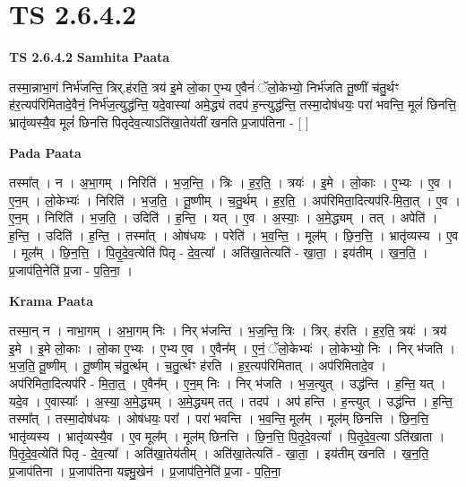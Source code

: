 \documentclass[17pt]{extarticle}
\begin{document}
\section{ TS 2.6.4.2 }

\textbf{TS 2.6.4.2 } \newline
\textbf{Samhita Paata} \newline

तस्मा॒न्नाभा॒गं निर्भ॑जन्ति॒ त्रिर्.ह॑रति॒ त्रय॑ इ॒मे लो॒का ए॒भ्य ए॒वैनं॑ ॅलो॒केभ्यो॒ निर्भ॑जति तू॒ष्णीं च॑तु॒र्थꣳ ह॑र॒त्यप॑रिमितादे॒वैनं॒ निर्भ॑ज॒त्युद्ध॑न्ति॒ यदे॒वास्या॑ अमे॒द्ध्यं तदप॑ ह॒न्त्युद्ध॑न्ति॒ तस्मा॒दोष॑धयः॒ परा॑ भवन्ति॒ मूलं॑ छिनत्ति॒ भ्रातृ॑व्यस्यै॒व मूलं॑ छिनत्ति पितृदेव॒त्याऽति॑खा॒तेय॑तीं खनति प्र॒जाप॑तिना - [  ] \newline

\textbf{Pada Paata} \newline

तस्मा᳚त् । न । अ॒भा॒गम् । निरिति॑ । भ॒ज॒न्ति॒ । त्रिः । ह॒र॒ति॒ । त्रयः॑ । इ॒मे । लो॒काः । ए॒भ्यः । ए॒व । ए॒न॒म् । लो॒केभ्यः॑ । निरिति॑ । भ॒ज॒ति॒ । तू॒ष्णीम् । च॒तु॒र्थम् । ह॒र॒ति॒ । अप॑रिमिता॒दित्यप॑रि-मि॒ता॒त् । ए॒व । ए॒न॒म् । निरिति॑ । भ॒ज॒ति॒ । उदिति॑ । ह॒न्ति॒ । यत् । ए॒व । अ॒स्याः॒ । अ॒मे॒द्ध्यम् । तत् । अपेति॑ । ह॒न्ति॒ । उदिति॑ । ह॒न्ति॒ । तस्मा᳚त् । ओष॑धयः । परेति॑ । भ॒व॒न्ति॒ । मूल᳚म् । छि॒न॒त्ति॒ । भ्रातृ॑व्यस्य । ए॒व । मूल᳚म् । छि॒न॒त्ति॒ । पि॒तृ॒दे॒व॒त्येति॑ पितृ - दे॒व॒त्या᳚ । अति॑खा॒तेत्यति॑ - खा॒ता॒ । इय॑तीम् । ख॒न॒ति॒ । प्र॒जाप॑ति॒नेति॑ प्र॒जा - प॒ति॒ना॒ ।  \newline


\textbf{Krama Paata} \newline

तस्मा॒न् न । नाभा॒गम् । अ॒भा॒गम् निः । निर् भ॑जन्ति । भ॒ज॒न्ति॒ त्रिः । त्रिर्. ह॑रति । ह॒र॒ति॒ त्रयः॑ । त्रय॑ इ॒मे । इ॒मे लो॒काः । लो॒का ए॒भ्यः । ए॒भ्य ए॒व । ए॒वैन᳚म् । ए॒नं॒ ॅलो॒केभ्यः॑ । लो॒केभ्यो॒ निः । निर् भ॑जति । भ॒ज॒ति॒ तू॒ष्णीम् । तू॒ष्णीम् च॑तु॒र्त्थम् । च॒तु॒र्त्थꣳ ह॑रति । ह॒र॒त्यप॑रिमितात् । अप॑रिमितादे॒व । अप॑रिमिता॒दित्यप॑रि - मि॒ता॒त्॒ । ए॒वैन᳚म् । ए॒न॒म् निः । निर् भ॑जति । भ॒ज॒त्युत् । उद्ध॑न्ति । ह॒न्ति॒ यत् । यदे॒व । ए॒वास्याः᳚ । अ॒स्या॒ अ॒मे॒द्ध्यम् । अ॒मे॒द्ध्यम् तत् । तदप॑ । अप॑ हन्ति । ह॒न्त्युत् । उद्ध॑न्ति । ह॒न्ति॒ तस्मा᳚त् । तस्मा॒दोष॑धयः । ओष॑धयः॒ परा᳚ । परा॑ भवन्ति । भ॒व॒न्ति॒ मूल᳚म् । मूल॑म् छिनत्ति । छि॒न॒त्ति॒ भातृ॑व्यस्य । भ्रातृ॑व्यस्यै॒व । ए॒व मूल᳚म् । मूल॑म् छिनत्ति । छि॒न॒त्ति॒ पि॒तृ॒दे॒वत्या᳚ । पि॒तृ॒दे॒व॒त्या ऽति॑खाता । पि॒तृ॒दे॒व॒त्येति॑ पितृ - दे॒व॒त्या᳚ । अति॑खा॒तेय॑तीम् । अति॑खा॒तेत्यति॑ - खा॒ता॒ । इय॑तीम् खनति । ख॒न॒ति॒ प्र॒जाप॑तिना । प्र॒जाप॑तिना यज्ञ्मु॒खेन॑ । प्र॒जाप॑ति॒नेति॑ प्र॒जा - प॒ति॒ना॒ \newline
\end{document}
